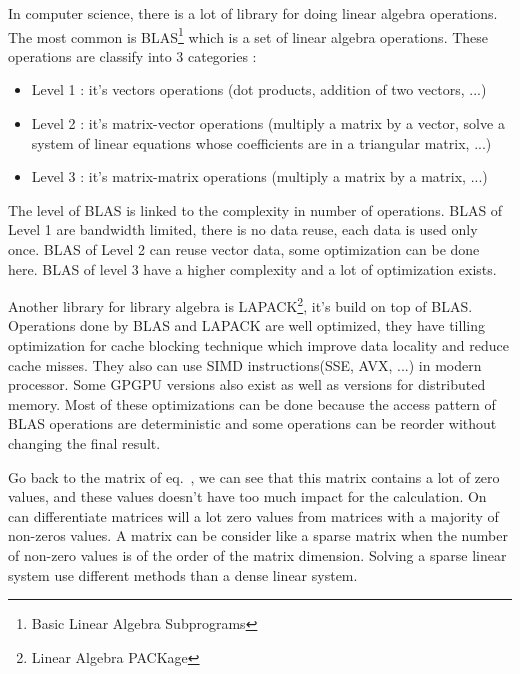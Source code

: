 In computer science, there is a lot of library for doing linear algebra operations.
%
The most common is BLAS\footnote{Basic Linear Algebra Subprograms} which is a set of linear algebra operations.
%
These operations are classify into 3 categories :
\begin{itemize}
  \item Level 1 : it's vectors operations (dot products, addition of two vectors, ...)
  \item Level 2 : it's matrix-vector operations (multiply a matrix by a vector, solve a system of linear equations whose coefficients are in a triangular matrix, ...)
  \item Level 3 : it's matrix-matrix operations (multiply a matrix by a matrix, ...)
\end{itemize}
%
The level of BLAS is linked to the complexity in number of operations.
%
BLAS of Level 1 are bandwidth limited, there is no data reuse, each data is used only once.
%
BLAS of Level 2 can reuse vector data, some optimization can be done here.
%
BLAS of level 3 have a higher complexity and a lot of optimization exists.

Another library for library algebra is LAPACK\footnote{Linear Algebra PACKage}, it's build on top of BLAS.
%
Operations done by BLAS and LAPACK are well optimized, they have tilling optimization for cache blocking technique which improve data locality and reduce cache misses.
%
They also can use SIMD instructions(SSE, AVX, ...) in modern processor.
%
Some GPGPU versions also exist as well as versions for distributed memory.
%
Most of these optimizations can be done because the access pattern of BLAS operations are deterministic and some operations can be reorder without changing the final result.


Go back to the matrix of eq.~\cite{eq:ax_b}, we can see that this matrix contains a lot of zero values, and these values doesn't have too much impact for the calculation.
%
On can differentiate matrices will a lot zero values from matrices with a majority of non-zeros values.
%
A matrix can be consider like a sparse matrix when the number of non-zero values is of the order of the matrix dimension.
%
Solving a sparse linear system use different methods than a dense linear system.
